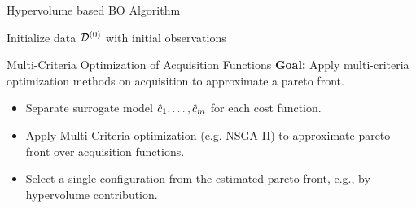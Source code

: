 \begin{frame}{Hypervolume based BO Algorithm}


\begin{center}
\begin{minipage}{0.8\textwidth}
\begin{algorithm}[H]
    \setcounter{AlgoLine}{0}


	Initialize data $\iter[0]{\dataset}$ with initial observations\;%

    \For{$\bocount=1$ \KwTo $\bobudget$}{

		Fit predictive models $\iter[\bocount]{\surro_1}, \dots, \iter[\bocount]{\surro_m}$ on $\iter[\bocount-1]{\dataset}$\;

		Select next query point: $\bonextsample \in \argmax_{\conf \in \pcs} \acq(\conf; \iter[\bocount-1]{\dataset}, \iter[\bocount]{\surro_1}, \dots, \iter[\bocount]{\surro_m}))$\;

		Query $\bonextobs$\;

		Update data: $\iter[\bocount]{\dataset} \leftarrow \iter[\bocount-1]{\dataset} \cup \{\langle \bonextsample, \bonextobs \rangle \}$\;
	}
	\caption*{Hypervolume based BO loop}
\end{algorithm}
\end{minipage}
\end{center}
\end{frame}

\begin{frame}{Multi-Criteria Optimization of Acquisition Functions}
    \textbf{Goal:} Apply multi-criteria optimization methods on acquisition to approximate a pareto front.

    \begin{itemize}
       \item Separate surrogate model $\surro_1, \dots, \surro_m$ for each cost function.
       \item Apply Multi-Criteria optimization (e.g. NSGA-II) to approximate pareto front over acquisition functions.
       \item Select a single configuration from the estimated pareto front, e.g., by hypervolume contribution.
    \end{itemize}
\end{frame}



